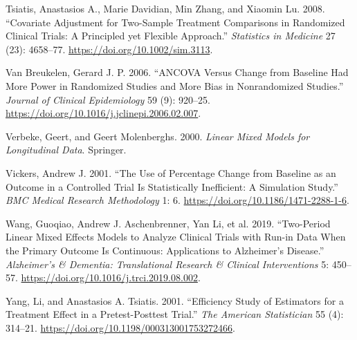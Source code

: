 \documentclass[
  11pt,
]{article}
\newlength{\cslhangindent}
\newenvironment{CSLReferences}[2] %
 {\begin{list}{}{%
  \setlength{\itemindent}{0pt}
  \setlength{\leftmargin}{0pt}
  \setlength{\parsep}{0pt}
  \ifodd #1
   \setlength{\leftmargin}{\cslhangindent}
   \setlength{\itemindent}{-1\cslhangindent}
  \fi
  \setlength{\itemsep}{#2\baselineskip}}}
 {\end{list}}
\begin{document}
\begin{CSLReferences}{1}{1}
Tsiatis, Anastasios A., Marie Davidian, Min Zhang, and Xiaomin Lu. 2008.
{``Covariate Adjustment for Two-Sample Treatment Comparisons in
Randomized Clinical Trials: A Principled yet Flexible Approach.''}
\emph{Statistics in Medicine} 27 (23): 4658--77.
\url{https://doi.org/10.1002/sim.3113}.

Van Breukelen, Gerard J. P. 2006. {``{ANCOVA} Versus Change from
Baseline Had More Power in Randomized Studies and More Bias in
Nonrandomized Studies.''} \emph{Journal of Clinical Epidemiology} 59
(9): 920--25. \url{https://doi.org/10.1016/j.jclinepi.2006.02.007}.

Verbeke, Geert, and Geert Molenberghs. 2000. \emph{Linear Mixed Models
for Longitudinal Data}. Springer.

Vickers, Andrew J. 2001. {``The Use of Percentage Change from Baseline
as an Outcome in a Controlled Trial Is Statistically Inefficient: A
Simulation Study.''} \emph{BMC Medical Research Methodology} 1: 6.
\url{https://doi.org/10.1186/1471-2288-1-6}.

Wang, Guoqiao, Andrew J. Aschenbrenner, Yan Li, et al. 2019.
{``Two-Period Linear Mixed Effects Models to Analyze Clinical Trials
with Run-in Data When the Primary Outcome Is Continuous: {Applications}
to {Alzheimer's} Disease.''} \emph{Alzheimer's \& Dementia:
Translational Research \& Clinical Interventions} 5: 450--57.
\url{https://doi.org/10.1016/j.trci.2019.08.002}.

Yang, Li, and Anastasios A. Tsiatis. 2001. {``Efficiency Study of
Estimators for a Treatment Effect in a Pretest-Posttest Trial.''}
\emph{The American Statistician} 55 (4): 314--21.
\url{https://doi.org/10.1198/000313001753272466}.

\end{CSLReferences}
\end{document}
